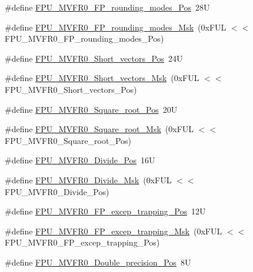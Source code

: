\begin{DoxyCompactItemize}
\item 
\#define \hyperlink{group___c_m_s_i_s___f_p_u_ga1ebcc9076f08013f0ea814540df03e82}{F\+P\+U\+\_\+\+M\+V\+F\+R0\+\_\+\+F\+P\+\_\+rounding\+\_\+modes\+\_\+\+Pos}~28U
\item 
\#define \hyperlink{group___c_m_s_i_s___f_p_u_gae6dc9339ac72227d5d54360bb9fbef1b}{F\+P\+U\+\_\+\+M\+V\+F\+R0\+\_\+\+F\+P\+\_\+rounding\+\_\+modes\+\_\+\+Msk}~(0x\+F\+U\+L $<$$<$ F\+P\+U\+\_\+\+M\+V\+F\+R0\+\_\+\+F\+P\+\_\+rounding\+\_\+modes\+\_\+\+Pos)
\item 
\#define \hyperlink{group___c_m_s_i_s___f_p_u_gabbf83a918536ebf10889cee71a0404c7}{F\+P\+U\+\_\+\+M\+V\+F\+R0\+\_\+\+Short\+\_\+vectors\+\_\+\+Pos}~24U
\item 
\#define \hyperlink{group___c_m_s_i_s___f_p_u_gabf261a72023fdfc64f32c6b21d55c5b9}{F\+P\+U\+\_\+\+M\+V\+F\+R0\+\_\+\+Short\+\_\+vectors\+\_\+\+Msk}~(0x\+F\+U\+L $<$$<$ F\+P\+U\+\_\+\+M\+V\+F\+R0\+\_\+\+Short\+\_\+vectors\+\_\+\+Pos)
\item 
\#define \hyperlink{group___c_m_s_i_s___f_p_u_ga176c85453ba03257bf263adec05f7344}{F\+P\+U\+\_\+\+M\+V\+F\+R0\+\_\+\+Square\+\_\+root\+\_\+\+Pos}~20U
\item 
\#define \hyperlink{group___c_m_s_i_s___f_p_u_ga3ec0bfec1640bdaf9dff027f275b446d}{F\+P\+U\+\_\+\+M\+V\+F\+R0\+\_\+\+Square\+\_\+root\+\_\+\+Msk}~(0x\+F\+U\+L $<$$<$ F\+P\+U\+\_\+\+M\+V\+F\+R0\+\_\+\+Square\+\_\+root\+\_\+\+Pos)
\item 
\#define \hyperlink{group___c_m_s_i_s___f_p_u_ga167be203091e6cc7d00ad40ca48c4396}{F\+P\+U\+\_\+\+M\+V\+F\+R0\+\_\+\+Divide\+\_\+\+Pos}~16U
\item 
\#define \hyperlink{group___c_m_s_i_s___f_p_u_gaeb7370768c6cdf06f8a15c86c6102ed2}{F\+P\+U\+\_\+\+M\+V\+F\+R0\+\_\+\+Divide\+\_\+\+Msk}~(0x\+F\+U\+L $<$$<$ F\+P\+U\+\_\+\+M\+V\+F\+R0\+\_\+\+Divide\+\_\+\+Pos)
\item 
\#define \hyperlink{group___c_m_s_i_s___f_p_u_ga5c0715c41c4470f8bb0b6dcd34707f1c}{F\+P\+U\+\_\+\+M\+V\+F\+R0\+\_\+\+F\+P\+\_\+excep\+\_\+trapping\+\_\+\+Pos}~12U
\item 
\#define \hyperlink{group___c_m_s_i_s___f_p_u_ga29bbddd679e821e050699fda23e6c85e}{F\+P\+U\+\_\+\+M\+V\+F\+R0\+\_\+\+F\+P\+\_\+excep\+\_\+trapping\+\_\+\+Msk}~(0x\+F\+U\+L $<$$<$ F\+P\+U\+\_\+\+M\+V\+F\+R0\+\_\+\+F\+P\+\_\+excep\+\_\+trapping\+\_\+\+Pos)
\item 
\#define \hyperlink{group___c_m_s_i_s___f_p_u_ga461e26147be0c39402a78cb6249e8f84}{F\+P\+U\+\_\+\+M\+V\+F\+R0\+\_\+\+Double\+\_\+precision\+\_\+\+Pos}~8U
$$
\end{DoxyCompactItemize}
